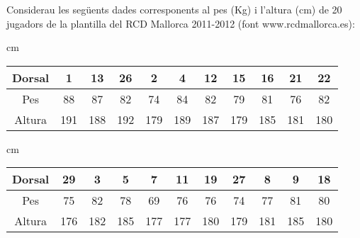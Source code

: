 \documentclass[a4paper,10pt]{article}
\begin{document}
\noindent
Considerau les següents dades corresponents al pes (Kg) i l'altura (cm) de 20 jugadors de la plantilla del RCD Mallorca 2011-2012
 (font www.rcdmallorca.es):


 cm
\begin{center}
\begin{tabular}{|c|cccccccccc|}
\hline
Dorsal & 1 & 13 & 26 & 2 & 4 & 12 & 15 & 16 & 21 & 22 \\
\hline
Pes & 88 & 87 & 82 & 74 & 84 & 82 & 79 & 81 & 76 & 82  \\
\hline
Altura & 191 & 188 & 192 & 179 & 189 & 187 & 179 & 185 & 181 & 180\\
\hline
\end{tabular}
\end{center}

 cm
\begin{center}
\begin{tabular}{|c|cccccccccc|}
\hline
Dorsal & 29 & 3 & 5 & 7 & 11 & 19 & 27 & 8 & 9 & 18\\
\hline
Pes & 75 & 82 & 78 & 69 & 76 & 76 &  74 & 77 & 81 & 80 \\
\hline
Altura &  176 & 182 & 185 & 177 & 177 & 180 & 179 & 181 & 185 &  180\\
\hline
\end{tabular}
\end{center}
\end{document}
